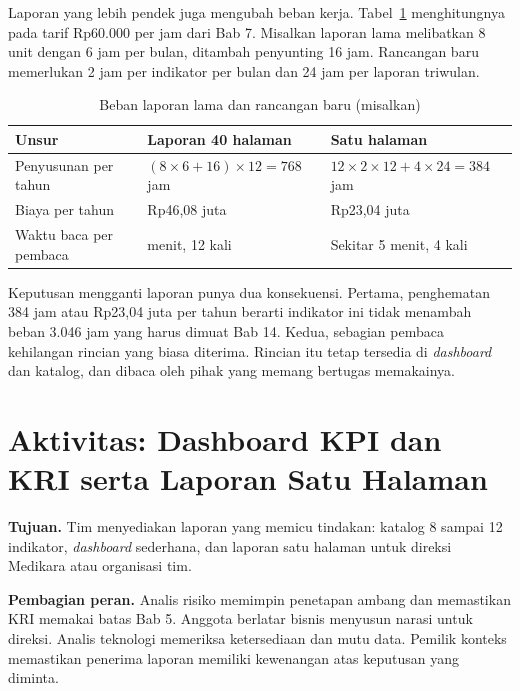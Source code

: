 Laporan yang lebih pendek juga mengubah beban kerja. Tabel~\ref{tab:ch13-beban} menghitungnya pada
tarif Rp60.000 per jam dari Bab 7. Misalkan laporan lama melibatkan 8 unit dengan 6 jam per bulan,
ditambah penyunting 16 jam. Rancangan baru memerlukan 2 jam per indikator per bulan dan 24 jam per
laporan triwulan.

\begin{table}[!htb]
  \centering\small
  \caption{Beban laporan lama dan rancangan baru (misalkan)}\label{tab:ch13-beban}
  \begin{tabularx}{\textwidth}{|>{\raggedright\arraybackslash}X|>{\raggedright\arraybackslash}p{}|>{\raggedright\arraybackslash}p{}|}
    \hline
    \textbf{Unsur} & \textbf{Laporan 40 halaman} & \textbf{Satu halaman} \\ \hline
    Penyusunan per tahun & $(8 \times 6 + 16) \times 12 = 768$ jam & $12 \times 2 \times 12 + 4
    \times 24 = 384$ jam \\ \hline
    Biaya per tahun & Rp46,08 juta & Rp23,04 juta \\ \hline
    Waktu baca per pembaca & 80 menit, 12 kali & Sekitar 5 menit, 4 kali \\ \hline
  \end{tabularx}
\end{table}

Keputusan mengganti laporan punya dua konsekuensi. Pertama, penghematan 384 jam atau Rp23,04 juta
per tahun berarti indikator ini tidak menambah beban 3.046 jam yang harus dimuat Bab 14. Kedua,
sebagian pembaca kehilangan rincian yang biasa diterima. Rincian itu tetap tersedia di
\textit{dashboard} dan katalog, dan dibaca oleh pihak yang memang bertugas memakainya.

\section{Aktivitas: Dashboard KPI dan KRI serta Laporan Satu Halaman}

\textbf{Tujuan.} Tim menyediakan laporan yang memicu tindakan: katalog 8 sampai 12 indikator,
\textit{dashboard} sederhana, dan laporan satu halaman untuk direksi Medikara atau organisasi tim.

\textbf{Pembagian peran.} Analis risiko memimpin penetapan ambang dan memastikan KRI memakai batas
Bab 5. Anggota berlatar bisnis menyusun narasi untuk direksi. Analis teknologi memeriksa
ketersediaan dan mutu data. Pemilik konteks memastikan penerima laporan memiliki kewenangan atas
keputusan yang diminta.

